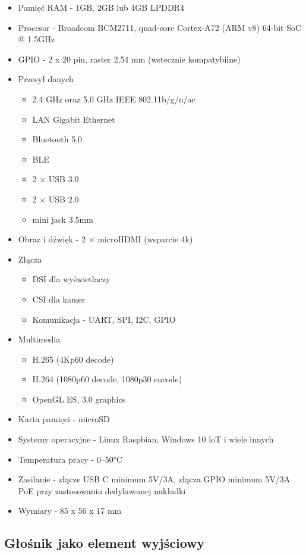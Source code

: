 \documentclass[a4paper,12pt,reqno]{article}
\begin{document}
\begin{itemize}
	\item Pamięć RAM - 1GB, 2GB lub 4GB LPDDR4
	\item Procesor - Broadcom BCM2711, quad-core Cortex-A72 (ARM v8) 64-bit SoC @ 1.5GHz
	\item GPIO - 2 x 20 pin, raster 2,54 mm (wstecznie kompatybilne)
	\item Przesył danych
		\begin{itemize}
			\item 2.4 GHz oraz 5.0 GHz IEEE 802.11b/g/n/ac
			\item LAN Gigabit Ethernet
			\item Bluetooth 5.0
			\item \textcolor{to_check_at_end}{BLE}
			\item 2 × USB 3.0
			\item 2 × USB 2.0
			\item \textcolor{edited}{mini jack 3.5mm}
		\end{itemize}
	\item Obraz i dźwięk - 2 × microHDMI (wsparcie 4k)
	\item Złącza
		\begin{itemize}
			\item DSI dla wyświetlaczy
			\item CSI dla kamer
			\item Komunikacja - UART, SPI, I2C, GPIO
		\end{itemize}
	\item Multimedia
		\begin{itemize}
			\item H.265 (4Kp60 decode)
			\item H.264 (1080p60 decode, 1080p30 encode)
			\item OpenGL ES, 3.0 graphics
		\end{itemize}
	\item Karta pamięci - microSD
	\item Systemy operacyjne - Linux Raspbian, Windows 10 loT i wiele innych
	\item Temperatura pracy - 0–50°C
	\item Zasilanie - złącze USB C minimum 5V/3A, złącza GPIO minimum 5V/3A
PoE przy zastosowaniu dedykowanej nakładki
	\item Wymiary - 85 x 56 x 17 mm
\end{itemize}

\subsection{Głośnik jako element wyjściowy}
\end{document}
